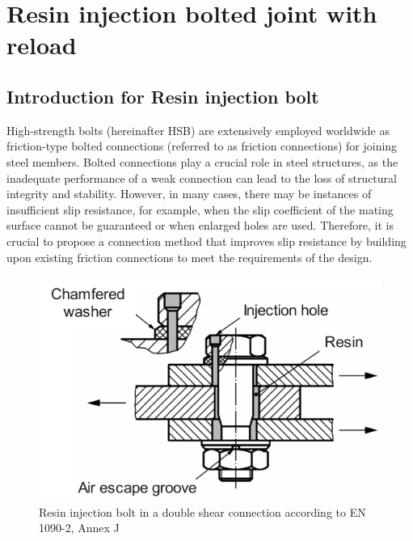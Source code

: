 \chapter{Resin injection bolted joint with reload}
\label{app3}
\onehalfspacing

\section{Introduction for Resin injection bolt}

 High-strength bolts (hereinafter HSB) are extensively employed worldwide as friction-type bolted connections (referred to as friction connections) for joining steel members. Bolted connections play a crucial role in steel structures, as the inadequate performance of a weak connection can lead to the loss of structural integrity and stability. However, in many cases, there may be instances of insufficient slip resistance, for example, when the slip coefficient of the mating surface cannot be guaranteed or when enlarged holes are used. Therefore, it is crucial to propose a connection method that improves slip resistance by building upon existing friction connections to meet the requirements of the design.

\begin{figure}[htbp]
    \centering
    \includegraphics[width=0.75\linewidth]{imgs//app3/iR-mecha.pdf}
    \caption{Resin injection bolt in a double shear connection according to EN 1090-2, Annex J}
    \label{fig-RI-mecha}
\end{figure}
    

